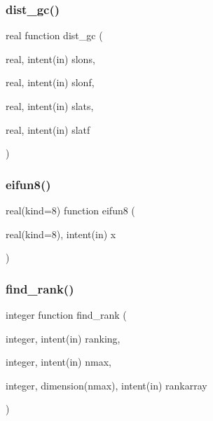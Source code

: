 \mbox{\label{numutils_8f90_abff00715b3227e38afe4c1a67416e4d2}} 
\subsubsection{\texorpdfstring{dist\+\_\+gc()}{dist\_gc()}}
{\footnotesize\ttfamily real function dist\+\_\+gc (\begin{DoxyParamCaption}\item[{real, intent(in)}]{slons,  }\item[{real, intent(in)}]{slonf,  }\item[{real, intent(in)}]{slats,  }\item[{real, intent(in)}]{slatf }\end{DoxyParamCaption})}

\mbox{\label{numutils_8f90_a87009269fa8aecf49be15f20599f3052}} 
\subsubsection{\texorpdfstring{eifun8()}{eifun8()}}
{\footnotesize\ttfamily real(kind=8) function eifun8 (\begin{DoxyParamCaption}\item[{real(kind=8), intent(in)}]{x }\end{DoxyParamCaption})}

\mbox{\label{numutils_8f90_a732ad4008d82d16d53c093bf1cecccc3}} 
\subsubsection{\texorpdfstring{find\+\_\+rank()}{find\_rank()}}
{\footnotesize\ttfamily integer function find\+\_\+rank (\begin{DoxyParamCaption}\item[{integer, intent(in)}]{ranking,  }\item[{integer, intent(in)}]{nmax,  }\item[{integer, dimension(nmax), intent(in)}]{rankarray }\end{DoxyParamCaption})}

